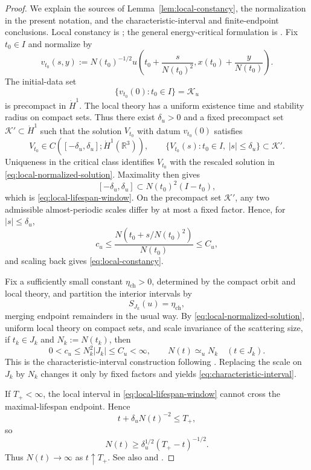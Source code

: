 \documentclass{interact}
\numberwithin{equation}{section}
\theoremstyle{plain}
\theoremstyle{definition}
\theoremstyle{remark}
\newcommand{\R}{\mathbb R}
\begin{document}
\begin{proof}
We explain the sources of Lemma~\ref{lem:local-constancy}, the normalization in the present notation, and the characteristic-interval and finite-endpoint conclusions. Local constancy is \cite[Lemma~1.5]{KillipVisan2012}; the general energy-critical formulation is \cite[Lemma~5.18]{KillipVisan2013}. Fix $t_0\in I$ and normalize by
\begin{equation}\label{eq:local-normalized-solution}
 v_{t_0}(s,y)
 :=N(t_0)^{-1/2}
 u\left(t_0+\frac{s}{N(t_0)^2},
 x(t_0)+\frac{y}{N(t_0)}\right).
\end{equation}
The initial-data set
\[
 \{v_{t_0}(0):t_0\in I\}=\mathcal K_u
\]
is precompact in $\dot H^1$. The local theory has a uniform existence time and stability radius on compact sets. Thus there exist $\delta_u>0$ and a fixed precompact set $\mathcal K'\subset\dot H^1$ such that the solution $V_{t_0}$ with datum $v_{t_0}(0)$ satisfies
\[
 V_{t_0}\in C([-\delta_u,\delta_u];\dot H^1(\R^3)),
 \qquad
 \{V_{t_0}(s):t_0\in I,\ |s|\le\delta_u\}\subset\mathcal K'.
\]
Uniqueness in the critical class identifies $V_{t_0}$ with the rescaled solution in \eqref{eq:local-normalized-solution}. Maximality then gives
\[
 [-\delta_u,\delta_u]\subset N(t_0)^2(I-t_0),
\]
which is \eqref{eq:local-lifespan-window}. On the precompact set $\mathcal K'$, any two admissible almost-periodic scales differ by at most a fixed factor. Hence, for $|s|\le\delta_u$,
\[
 c_u\le\frac{N(t_0+s/N(t_0)^2)}{N(t_0)}\le C_u,
\]
and scaling back gives \eqref{eq:local-constancy}.

Fix a sufficiently small constant $\eta_{\mathrm{ch}}>0$, determined by the compact orbit and local theory, and partition the interior intervals by
\[
 S_{J_k}(u)=\eta_{\mathrm{ch}},
\]
merging endpoint remainders in the usual way. By \eqref{eq:local-normalized-solution}, uniform local theory on compact sets, and scale invariance of the scattering size, if $t_k\in J_k$ and $N_k:=N(t_k)$, then
\[
 0<c_u\le N_k^2|J_k|\le C_u<\infty,
 \qquad
 N(t)\simeq_uN_k\quad(t\in J_k).
\]
This is the characteristic-interval construction following \cite[Lemma~1.7]{KillipVisan2012}. Replacing the scale on $J_k$ by $N_k$ changes it only by fixed factors and yields \eqref{eq:characteristic-interval}.

If $T_+<\infty$, the local interval in \eqref{eq:local-lifespan-window} cannot cross the maximal-lifespan endpoint. Hence
\[
 t+\delta_uN(t)^{-2}\le T_+,
\]
so
\[
 N(t)\ge\delta_u^{1/2}(T_+-t)^{-1/2}.
\]
Thus $N(t)\to\infty$ as $t\uparrow T_+$. See also \cite[Corollary~1.6]{KillipVisan2012} and \cite[Corollary~5.19]{KillipVisan2013}.
\end{proof}
\end{document}
